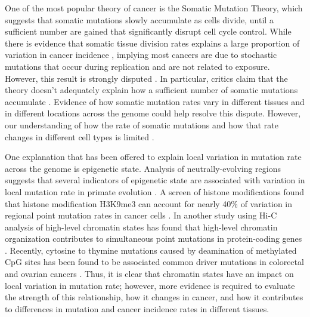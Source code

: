 One of the most popular theory of cancer is the Somatic Mutation Theory, which suggests that somatic mutations slowly accumulate as cells divide, until a sufficient number are gained that significantly disrupt cell cycle control. While there is evidence that somatic tissue division rates explains a large proportion of variation in cancer incidence \parencite{tomasetti_variation_2015}, implying most cancers are due to stochastic mutations that occur during replication and are not related to exposure. However, this result is strongly disputed \parencite{rozhok_critical_2015, wang_implications_2015}. In particular, critics claim that the theory doesn't adequately explain how a sufficient number of somatic mutations accumulate \parencite{baker_cancer_2015}. 
Evidence of how somatic mutation rates vary in different tissues and in different locations across the genome could help resolve this dispute.
However, our understanding of how the rate of somatic mutations and how that rate changes in different cell types is limited \parencite{stratton_cancer_2009}. 

One explanation that has been offered to explain local variation in mutation rate across the genome is epigenetic state. Analysis of neutrally-evolving regions suggests that several indicators of epigenetic state are associated with variation in local mutation rate in primate evolution \parencite{makova_effects_2015}.
A screen of histone modifications found that histone modification H3K9me3 can account for nearly 40\% of variation in regional point mutation rates in cancer cells \parencite{schuster-bockler_chromatin_2012}.
In another study using Hi-C analysis of high-level chromatin states has found that high-level chromatin organization contributes to simultaneous point mutations in protein-coding genes \parencite{shi_chromatin_2016}.
Recently, cytosine to thymine mutations caused by deamination of methylated CpG sites has been found to be associated common driver mutations in colorectal and ovarian cancers \parencite{gold_somatic_2017}.
Thus, it is clear that chromatin states have an impact on local variation in mutation rate; however, more evidence is required to evaluate the strength of this relationship, how it changes in cancer, and how it contributes to differences in mutation and cancer incidence rates in different tissues.



